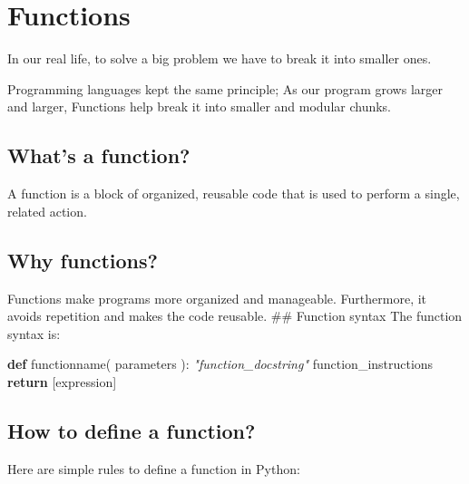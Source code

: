 \documentclass[11pt]{article}
\newenvironment{Shaded}{}{}
\newcommand{\KeywordTok}[1]{\textcolor[rgb]{0.00,0.44,0.13}{\textbf{{#1}}}}
\newcommand{\CommentTok}[1]{\textcolor[rgb]{0.38,0.63,0.69}{\textit{{#1}}}}
\newcommand{\NormalTok}[1]{{#1}}
\newcommand{\ControlFlowTok}[1]{\textcolor[rgb]{0.00,0.44,0.13}{\textbf{{#1}}}}
\begin{document}
    \hypertarget{functions}{%
\section{Functions}\label{functions}}

In our real life, to solve a big problem we have to break it into
smaller ones.

Programming languages kept the same principle; As our program grows
larger and larger, Functions help break it into smaller and modular
chunks.

\hypertarget{whats-a-function}{%
\subsection{What's a function?}\label{whats-a-function}}

A function is a block of organized, reusable code that is used to
perform a single, related action.

\hypertarget{why-functions}{%
\subsection{Why functions?}\label{why-functions}}

Functions make programs more organized and manageable. Furthermore, it
avoids repetition and makes the code reusable. \#\# Function syntax The
function syntax is:

\begin{Shaded}
\begin{Highlighting}[]
\KeywordTok{def}\NormalTok{ functionname( parameters ):}
    \CommentTok{"function\_docstring"}
\NormalTok{    function\_instructions}
    \ControlFlowTok{return}\NormalTok{ [expression]}
\end{Highlighting}
\end{Shaded}

\hypertarget{how-to-define-a-function}{%
\subsection{How to define a function?}\label{how-to-define-a-function}}

Here are simple rules to define a function in Python:
\end{document}
